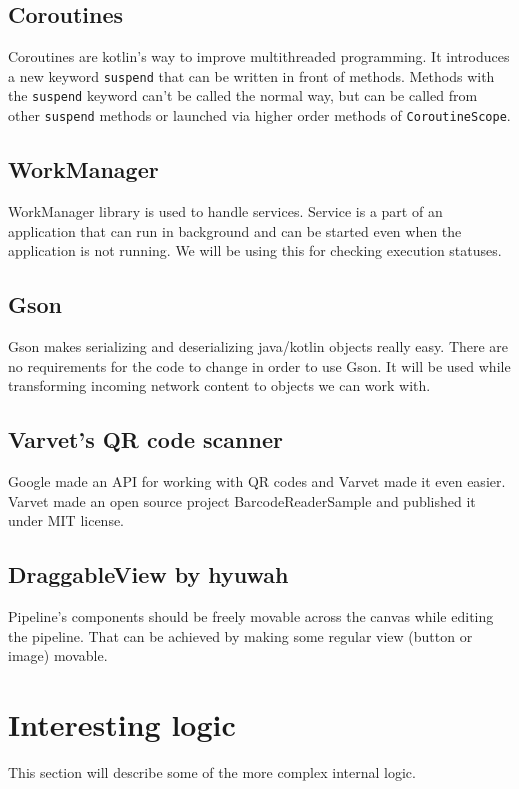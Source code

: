 \subsection{Coroutines}
Coroutines are kotlin's way to improve multithreaded programming.
It introduces a new keyword \verb|suspend| that can be written in front of methods.
Methods with the \verb|suspend| keyword can't be called the normal way, but can be called from other \verb|suspend| methods or launched via higher order methods of \verb|CoroutineScope|.

\subsection{WorkManager}
WorkManager library is used to handle services.
Service is a part of an application that can run in background and can be started even when the application is not running.
We will be using this for checking execution statuses.

\subsection{Gson}
Gson makes serializing and deserializing java/kotlin objects really easy.
There are no requirements for the code to change in order to use Gson.
It will be used while transforming incoming network content to objects we can work with.

\subsection{Varvet's QR code scanner}
Google made an API for working with QR codes and Varvet made it even easier.
Varvet made an open source project BarcodeReaderSample and published it under MIT license.

\subsection{DraggableView by hyuwah}
Pipeline's components should be freely movable across the canvas while editing the pipeline.
That can be achieved by making some regular view (button or image) movable.

\section{Interesting logic}
This section will describe some of the more complex internal logic.

